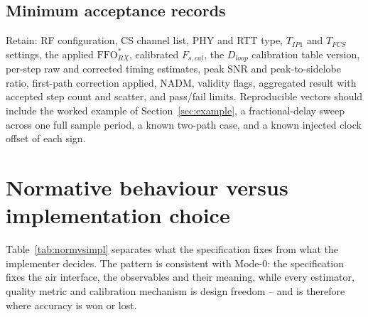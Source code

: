 \documentclass[11pt,a4paper]{article}
\newcommand{\FFO}{\mathrm{FFO}}
\newcommand{\NADM}{\mathrm{NADM}}
\newcommand{\Tip}{T_{IP1}}
\begin{document}
\subsection{Minimum acceptance records}

Retain: RF configuration, CS channel list, PHY and RTT type, $\Tip$ and $T_{FCS}$ settings, the
applied $\FFO^{*}_{RX}$, calibrated $F_{s,cal}$, the $D_{loop}$ calibration table version, per-step
raw and corrected timing estimates, peak SNR and peak-to-sidelobe ratio, first-path correction
applied, $\NADM$, validity flags, aggregated result with accepted step count and scatter, and
pass/fail limits. Reproducible vectors should include the worked example of
Section~\ref{sec:example}, a fractional-delay sweep across one full sample period, a known
two-path case, and a known injected clock offset of each sign.

\section{Normative behaviour versus implementation choice}

Table~\ref{tab:normvsimpl} separates what the specification fixes from what the implementer decides.
The pattern is consistent with Mode-0: the specification fixes the air interface, the observables and
their meaning, while every estimator, quality metric and calibration mechanism is design freedom --
and is therefore where accuracy is won or lost.
\end{document}
